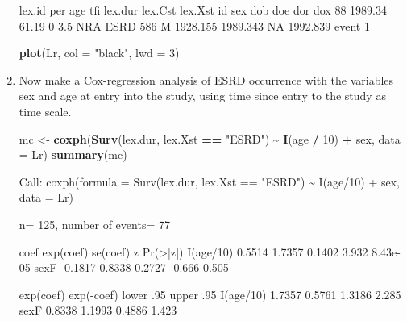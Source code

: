 \documentclass[
]{book}
\newenvironment{Shaded}{\begin{snugshade}}{\end{snugshade}}
\newcommand{\AttributeTok}[1]{\textcolor[rgb]{0.13,0.29,0.53}{#1}}
\newcommand{\DecValTok}[1]{\textcolor[rgb]{0.00,0.00,0.81}{#1}}
\newcommand{\FunctionTok}[1]{\textcolor[rgb]{0.13,0.29,0.53}{\textbf{#1}}}
\newcommand{\NormalTok}[1]{#1}
\newcommand{\OtherTok}[1]{\textcolor[rgb]{0.56,0.35,0.01}{#1}}
\newcommand{\SpecialCharTok}[1]{\textcolor[rgb]{0.81,0.36,0.00}{\textbf{#1}}}
\newcommand{\StringTok}[1]{\textcolor[rgb]{0.31,0.60,0.02}{#1}}
\begin{document}
\begin{enumerate}
\begin{Shaded}
\begin{Highlighting}[]
\NormalTok{ lex.id     per   age tfi lex.dur lex.Cst lex.Xst  id sex      dob      doe dor      dox}
\NormalTok{     88 1989.34 61.19   0     3.5     NRA    ESRD 586   M 1928.155 1989.343  NA 1992.839}
\NormalTok{ event}
\NormalTok{     1}
\end{Highlighting}
\end{Shaded}

\begin{Shaded}
\begin{Highlighting}[]
\FunctionTok{plot}\NormalTok{(Lr, }\AttributeTok{col =} \StringTok{"black"}\NormalTok{, }\AttributeTok{lwd =} \DecValTok{3}\NormalTok{)}
\end{Highlighting}
\end{Shaded}
\item
  Now make a Cox-regression analysis of ESRD occurrence with
  the variables sex and age at entry into the study, using time
  since entry to the study as time scale.

\begin{Shaded}
\begin{Highlighting}[]
\NormalTok{mc }\OtherTok{\textless{}{-}} \FunctionTok{coxph}\NormalTok{(}\FunctionTok{Surv}\NormalTok{(lex.dur, lex.Xst }\SpecialCharTok{==} \StringTok{"ESRD"}\NormalTok{) }
            \SpecialCharTok{\textasciitilde{}} \FunctionTok{I}\NormalTok{(age }\SpecialCharTok{/} \DecValTok{10}\NormalTok{) }\SpecialCharTok{+}\NormalTok{ sex, }\AttributeTok{data =}\NormalTok{ Lr)}
\FunctionTok{summary}\NormalTok{(mc)}
\end{Highlighting}
\end{Shaded}

\begin{Shaded}
\begin{Highlighting}[]
\NormalTok{Call:}
\NormalTok{coxph(formula = Surv(lex.dur, lex.Xst == "ESRD") \textasciitilde{} I(age/10) + }
\NormalTok{    sex, data = Lr)}

\NormalTok{  n= 125, number of events= 77 }

\NormalTok{             coef exp(coef) se(coef)      z Pr(\textgreater{}|z|)}
\NormalTok{I(age/10)  0.5514    1.7357   0.1402  3.932 8.43e{-}05}
\NormalTok{sexF      {-}0.1817    0.8338   0.2727 {-}0.666    0.505}

\NormalTok{          exp(coef) exp({-}coef) lower .95 upper .95}
\NormalTok{I(age/10)    1.7357     0.5761    1.3186     2.285}
\NormalTok{sexF         0.8338     1.1993    0.4886     1.423}


\end{Highlighting}
\end{Shaded}
\end{enumerate}
\end{document}
